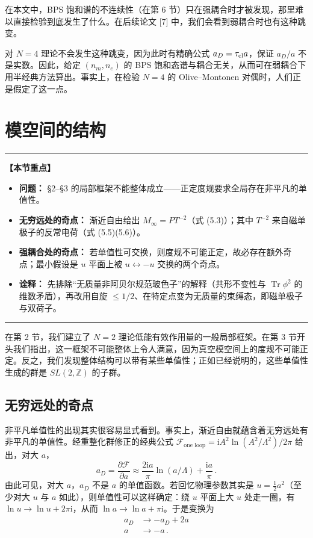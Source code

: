 \documentclass[11pt,a4paper,UTF8,fontset=fandol]{ctexart}
\theoremstyle{plain}
\theoremstyle{definition}
\newenvironment{keypoints}{%
  \par\addvspace{0.9em}%
  \noindent\begin{minipage}{\linewidth}%
  \color{black!80}\rule{\linewidth}{0.6pt}\par\vspace{2pt}%
  \noindent\textbf{【本节重点】}\par\vspace{2pt}%
  \begin{itemize}[leftmargin=1.6em,itemsep=1pt,topsep=2pt,parsep=0pt]%
}{%
  \end{itemize}\vspace{1pt}\noindent\color{black!80}\rule{\linewidth}{0.6pt}%
  \end{minipage}\par\addvspace{0.9em}%
}
\newcommand{\Z}{\mathbb{Z}}
\newcommand{\ii}{\mathrm{i}}
\newcommand{\Tr}{\operatorname{Tr}}
\newcommand{\Nc}{\mathcal{N}}
\newcommand{\Ff}{\mathcal{F}}
\def\Nc{N}%
\begin{document}
在本文中，BPS 饱和谱的不连续性（在第 6 节）只在强耦合时才被发现，那里难以直接检验到底发生了什么。在后续论文 [7] 中，我们会看到弱耦合时也有这种跳变。

对 $\Nc=4$ 理论不会发生这种跳变，因为此时有精确公式 $a_D=\tau_{\rm cl}a$，保证 $a_D/a$ 不是实数。因此，给定 $(n_m,n_e)$ 的 BPS 饱和态谱与耦合无关，从而可在弱耦合下用半经典方法算出。事实上，在检验 $\Nc=4$ 的 Olive--Montonen 对偶时，人们正是假定了这一点。

\section{模空间的结构}
\begin{keypoints}
  \item \textbf{问题：} §2--§3 的局部框架不能整体成立——正定度规要求全局存在非平凡的单值性。
  \item \textbf{无穷远处的奇点：} 渐近自由给出 $M_\infty=PT^{-2}$（式 (5.3)）；其中 $T^{-2}$ 来自磁单极子的反常电荷（式 (5.5)(5.6)）。
  \item \textbf{强耦合处的奇点：} 若单值性可交换，则度规不可能正定，故必存在额外奇点；最小假设是 $u$ 平面上被 $u\leftrightarrow-u$ 交换的两个奇点。
  \item \textbf{诠释：} 先排除“无质量非阿贝尔规范玻色子”的解释（共形不变性与 $\Tr\phi^2$ 的维数矛盾），再改用自旋 $\le1/2$、在特定点变为无质量的束缚态，即磁单极子与双荷子。
\end{keypoints}

在第 2 节，我们建立了 $\Nc=2$ 理论低能有效作用量的一般局部框架。在第 3 节开头我们指出，这一框架不可能整体上令人满意，因为真空模空间上的度规不可能正定。反之，我们发现整体结构可以带有某些单值性；正如已经说明的，这些单值性生成的群是 $SL(2,\Z)$ 的子群。

\subsection{无穷远处的奇点}

非平凡单值性的出现其实很容易显式看到。事实上，渐近自由就蕴含着无穷远处有非平凡的单值性。经重整化群修正的经典公式 $\Ff_{\text{one loop}}=\ii A^2\ln(A^2/\Lambda^2)/2\pi$ 给出，对大 $a$，
\begin{equation}
  a_D=\frac{\partial\Ff}{\partial a}\approx\frac{2\ii a}{\pi}\ln(a/\Lambda)+\frac{\ii a}{\pi}\,. \tag{5.1}
\end{equation}
由此可见，对大 $a$，$a_D$ 不是 $a$ 的单值函数。若回忆物理参数其实是 $u=\frac12a^2$（至少对大 $u$ 与 $a$ 如此），则单值性可以这样确定：绕 $u$ 平面上大 $u$ 处走一圈，有 $\ln u\to\ln u+2\pi\ii$，从而 $\ln a\to\ln a+\pi\ii$。于是变换为
\begin{equation}
  \begin{aligned}
    a_D&\to-a_D+2a\\
    a&\to-a\,.
  \end{aligned}
  \tag{5.2}
\end{equation}
\end{document}
